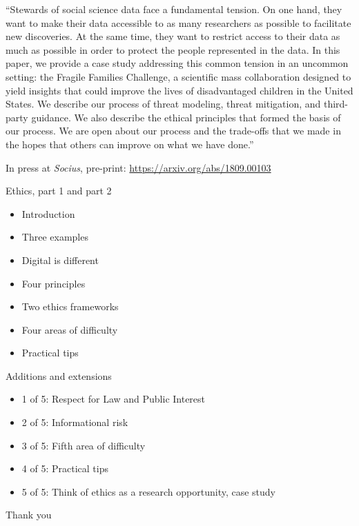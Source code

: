 \documentclass{beamer}
\begin{document}
\begin{frame}

``Stewards of social science data face a fundamental tension. On one hand, they want to make their data accessible to as many researchers as possible to facilitate new discoveries. At the same time, they want to restrict access to their data as much as possible in order to protect the people represented in the data. In this paper, we provide a case study addressing this common tension in an uncommon setting: the Fragile Families Challenge, a scientific mass collaboration designed to yield insights that could improve the lives of disadvantaged children in the United States. We describe our process of threat modeling, threat mitigation, and third-party guidance. We also describe the ethical principles that formed the basis of our process. We are open about our process and the trade-offs that we made in the hopes that others can improve on what we have done.''

\vfill
In press at \textit{Socius}, pre-print: \url{https://arxiv.org/abs/1809.00103}
\end{frame}
\begin{frame}

Ethics, part 1 and part 2
\begin{itemize}
\item Introduction
\item Three examples
\item Digital is different
\item Four principles
\item Two ethics frameworks
\item Four areas of difficulty
\item Practical tips
\end{itemize}

\end{frame}
\begin{frame}

Additions and extensions
\begin{itemize}
\item 1 of 5: Respect for Law and Public Interest
\item 2 of 5: Informational risk
\item 3 of 5: Fifth area of difficulty
\item 4 of 5: Practical tips
\item 5 of 5: Think of ethics as a research opportunity, case study
\end{itemize}

\end{frame}
\begin{frame}

\begin{center}
\Large Thank you
\end{center}

\end{frame}
\end{document}
